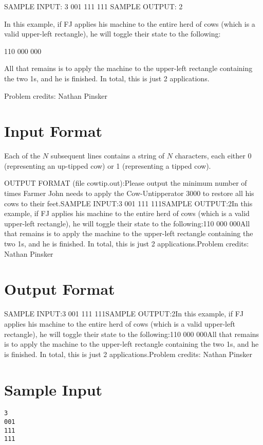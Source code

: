 \documentclass[12pt]{article}
\begin{document}
SAMPLE INPUT:
3
001
111
111
SAMPLE OUTPUT: 
2

In this example, if FJ applies his machine to the entire herd of cows (which is
a valid upper-left rectangle), he will
toggle their state to the following:


110
000
000

All that remains is to apply the machine to the upper-left rectangle containing
the two 1s, and he is finished.  In total, this is just 2 applications.


Problem credits: Nathan Pinsker



\section*{Input Format}
Each of the $N$ subsequent lines contains a string of $N$ characters, each
either 0 (representing an up-tipped cow) or 1 (representing a tipped cow).

OUTPUT FORMAT (file cowtip.out):Please output the minimum number of times Farmer John needs to apply the
Cow-Untipperator 3000 to restore all his cows to their feet.SAMPLE INPUT:3
001
111
111SAMPLE OUTPUT:2In this example, if FJ applies his machine to the entire herd of cows (which is
a valid upper-left rectangle), he will
toggle their state to the following:110
000
000All that remains is to apply the machine to the upper-left rectangle containing
the two 1s, and he is finished.  In total, this is just 2 applications.Problem credits: Nathan Pinsker

\section*{Output Format}
SAMPLE INPUT:3
001
111
111SAMPLE OUTPUT:2In this example, if FJ applies his machine to the entire herd of cows (which is
a valid upper-left rectangle), he will
toggle their state to the following:110
000
000All that remains is to apply the machine to the upper-left rectangle containing
the two 1s, and he is finished.  In total, this is just 2 applications.Problem credits: Nathan Pinsker

\section*{Sample Input}
\begin{verbatim}
3
001
111
111
\end{verbatim}
\end{document}
